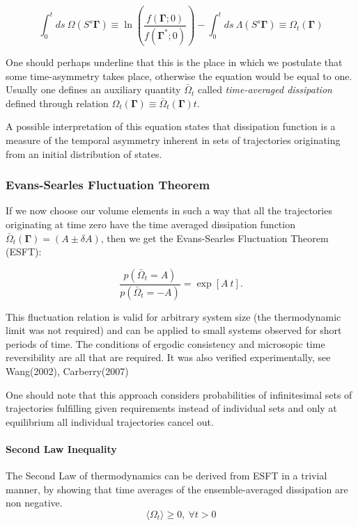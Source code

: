 \documentclass[a4paper,12pt]{article}
\begin{document}
\begin{equation}
  \label{Dissipation}
  \int_0^t ds\ \Omega(S^s \bm{\Gamma})\equiv \ln(\frac{f(\bm{\Gamma};0)}{f(\bm{\Gamma}^*;0)}) -\int_0^t ds \ \Lambda(S^s \bm{\Gamma}) \equiv \Omega_t(\bm{\Gamma})
\end{equation}

One should perhaps underline that this is the place in which we postulate that some time-asymmetry takes place, otherwise the equation \label{ReversibilityEvans} would be equal to one.
Usually one defines an auxiliary quantity $\bar{\Omega}_t$ called \textit{time-averaged dissipation} defined through relation $\Omega_t(\bm{\Gamma}) \equiv \bar{\Omega}_t(\bm{\Gamma})t$.

A possible interpretation of this equation states that dissipation function is a measure of the temporal asymmetry inherent in sets of trajectories originating from an initial distribution of states.

\subsubsection{Evans-Searles Fluctuation Theorem}

If we now choose our volume elements in such a way that all the trajectories originating at time zero have the time averaged dissipation function $\bar{\Omega}_t(\bm{\Gamma})=(A \pm \delta A)$, then we get the Evans-Searles Fluctuation Theorem (ESFT):

\begin{equation}
\label{ESFT}
  \frac{p(\bar{\Omega}_t=A)}{p(\bar{\Omega}_t=-A)}=\exp[A\ t].
\end{equation}

This fluctuation relation is valid for arbitrary system size (the thermodynamic limit was not required) and can be applied to small systems observed for short periods of time. The conditions of ergodic consistency and microsopic time reversibility are all that are required.
It was also verified experimentally, see Wang(2002)\cite{Wang:2002hw}, Carberry(2007)\cite{Carberry:2007be}

One should note that this approach considers probabilities of infinitesimal sets of trajectories fulfilling given requirements instead of individual sets and only at equilibrium all individual trajectories cancel out.

\paragraph{Second Law Inequality}
The Second Law of thermodynamics can be derived from ESFT in a trivial manner, by showing that time averages of the ensemble-averaged dissipation are non negative.
\begin{equation}
  \langle\Omega_t\rangle\geq 0,\  \forall t > 0
\end{equation}
\end{document}
